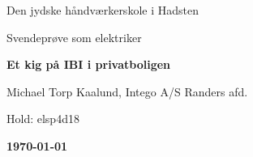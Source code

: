 \begin{titlepage}
    \centering
    {\LARGE Den jydske håndværkerskole i Hadsten \par}
    \vspace{1cm}
    {\Large Svendeprøve som elektriker \par}
    \vspace{1.5cm}
    {\huge\bfseries Et kig på IBI i privatboligen \par}
    \vspace{10cm}
    { Michael Torp Kaalund, Intego A/S Randers afd. \par}
    { Hold: elsp4d18 \par}
    \vfill
    {\bfseries \today\par}
\end{titlepage}

